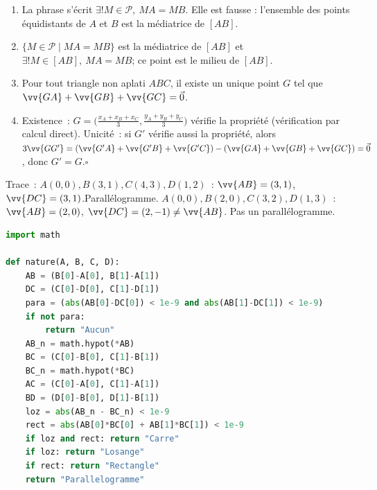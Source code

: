\begin{enumerate}
  \item La phrase s'écrit
        $\exists !M\in\mathcal P,\ MA=MB$. Elle est fausse : l'ensemble des
        points équidistants de $A$ et $B$ est la médiatrice de $[AB]$.
  \item $\{M\in\mathcal P\mid MA=MB\}$ est la médiatrice de $[AB]$ et
        $\exists !M\in[AB],\ MA=MB$; ce point est le milieu de $[AB]$.
  \item Pour tout triangle non aplati $ABC$, il existe un unique point $G$
        tel que $\vv{GA}+\vv{GB}+\vv{GC}=\vec{0}$.
  \item Existence~: $G=\bigl(\frac{x_A+x_B+x_C}{3},\frac{y_A+y_B+y_C}{3}\bigr)$ v\'erifie la propri\'et\'e
        (v\'erification par calcul direct). Unicit\'e~: si $G'$ v\'erifie aussi la propri\'et\'e,
        alors $3\vv{GG'}=(\vv{G'A}+\vv{G'B}+\vv{G'C})-(\vv{GA}+\vv{GB}+\vv{GC})=\vec{0}$,
        donc $G'=G$.\hfill$\square$
\end{enumerate}


Trace~:
$A(0,0),B(3,1),C(4,3),D(1,2)$~: $\vv{AB}=(3,1)$, $\vv{DC}=(3,1)$.\checkmark\quad Parall\'elogramme.
$A(0,0),B(2,0),C(3,2),D(1,3)$~: $\vv{AB}=(2,0)$, $\vv{DC}=(2,-1)\ne\vv{AB}$. Pas un parall\'elogramme.


\begin{lstlisting}[language=Python]
import math

def nature(A, B, C, D):
    AB = (B[0]-A[0], B[1]-A[1])
    DC = (C[0]-D[0], C[1]-D[1])
    para = (abs(AB[0]-DC[0]) < 1e-9 and abs(AB[1]-DC[1]) < 1e-9)
    if not para:
        return "Aucun"
    AB_n = math.hypot(*AB)
    BC = (C[0]-B[0], C[1]-B[1])
    BC_n = math.hypot(*BC)
    AC = (C[0]-A[0], C[1]-A[1])
    BD = (D[0]-B[0], D[1]-B[1])
    loz = abs(AB_n - BC_n) < 1e-9
    rect = abs(AB[0]*BC[0] + AB[1]*BC[1]) < 1e-9
    if loz and rect: return "Carre"
    if loz: return "Losange"
    if rect: return "Rectangle"
    return "Parallelogramme"
\end{lstlisting}


